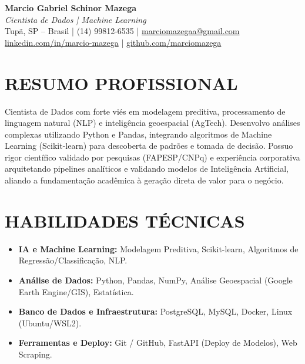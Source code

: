 \documentclass[11pt,a4paper]{article}
\begin{document}
\pagestyle{empty}

{\centering
\textbf{\huge Marcio Gabriel Schinor Mazega} \\ \vspace{0.2cm}
\textit{\large Cientista de Dados | Machine Learning} \\ \vspace{0.1cm}
Tupã, SP -- Brasil | (14) 99812-6535 | \href{mailto:marciomazegaa@gmail.com}{marciomazegaa@gmail.com} \\
\href{https://linkedin.com/in/marcio-mazega}{linkedin.com/in/marcio-mazega} | \href{https://github.com/marciomazega}{github.com/marciomazega} \\
}

\vspace{0.4cm}
\section*{RESUMO PROFISSIONAL}
Cientista de Dados com forte viés em modelagem preditiva, processamento de linguagem natural (NLP) e inteligência geoespacial (AgTech). Desenvolvo análises complexas utilizando Python e Pandas, integrando algoritmos de Machine Learning (Scikit-learn) para descoberta de padrões e tomada de decisão. Possuo rigor científico validado por pesquisas (FAPESP/CNPq) e experiência corporativa arquitetando pipelines analíticos e validando modelos de Inteligência Artificial, aliando a fundamentação acadêmica à geração direta de valor para o negócio.

\vspace{0.2cm}
\section*{HABILIDADES TÉCNICAS}
\begin{itemize}
    \item \textbf{IA e Machine Learning:} Modelagem Preditiva, Scikit-learn, Algoritmos de Regressão/Classificação, NLP.
    \item \textbf{Análise de Dados:} Python, Pandas, NumPy, Análise Geoespacial (Google Earth Engine/GIS), Estatística.
    \item \textbf{Banco de Dados e Infraestrutura:} PostgreSQL, MySQL, Docker, Linux (Ubuntu/WSL2).
    \item \textbf{Ferramentas e Deploy:} Git / GitHub, FastAPI (Deploy de Modelos), Web Scraping.
\end{itemize}

\vspace{0.2cm}
\end{document}
